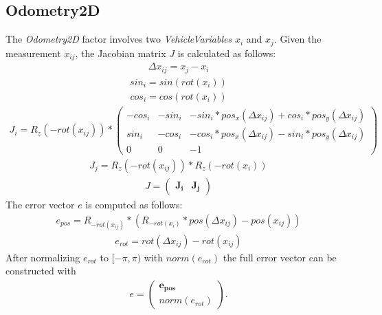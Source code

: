 \subsection{Odometry2D}
The \textit{Odometry2D} factor involves two \textit{VehicleVariables} $x_i$ and $x_j$. Given the measurement $x_{ij}$, the Jacobian matrix $J$ is calculated as follows:
\begin{align}
	\Delta x_{ij} = x_j - x_i
\end{align}
\begin{align}
	sin_i = sin(rot(x_i))
\end{align}
\begin{align}
	cos_i = cos(rot(x_i))
\end{align}
\begin{align}
	J_i = R_z(-rot(x_{ij})) *
	\begin{pmatrix}
		-cos_i & -sin_i & -sin_i*pos_x(\Delta x_{ij}) + cos_i*pos_y(\Delta x_{ij})\\
		 sin_i & -cos_i & -cos_i*pos_x(\Delta x_{ij}) - sin_i*pos_y(\Delta x_{ij})\\
		     0 &      0 &                                   -1
	\end{pmatrix}
\end{align}
\begin{align}
	J_j = R_z(-rot(x_{ij})) * R_z(-rot(x_i))
\end{align}
\begin{align}
	J =
	\begin{pmatrix}
		\boldsymbol{J_i} & \boldsymbol{J_j}
	\end{pmatrix}
\end{align}
The error vector $e$ is computed as follows:
\begin{align}
	e_{pos} = R_{-rot(x_{ij})} * (R_{-rot(x_i)} * pos(\Delta x_{ij}) - pos(x_{ij}))
\end{align}
\begin{align}
	e_{rot} = rot(\Delta x_{ij}) - rot(x_{ij})
\end{align}
After normalizing $e_{rot}$ to $[-\pi, \pi)$ with $norm(e_{rot})$ the full error vector can be constructed with
\begin{align}
	e =
	\begin{pmatrix}
		\boldsymbol{e_{pos}}\\
		norm(e_{rot})
	\end{pmatrix}
	.
\end{align}



